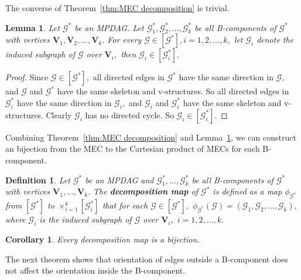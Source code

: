 \documentclass{article}
\newtheorem{definition}{Definition}
\newtheorem{lemma}{Lemma}
\newtheorem{corollary}{Corollary}
\begin{document}
The converse of Theorem~\ref{thm:MEC decomposition} is trivial.

\begin{lemma}
\label{lemma:inverse decomposition of MEC}
Let $\mathcal{G}^*$ be an MPDAG. Let $\mathcal{G}^*_1,\mathcal{G}^*_2,\dots,\mathcal{G}^*_k$ be all B-components of $\mathcal{G}^*$ with vertices $\mathbf{V}_1,\mathbf{V}_2,\dots,\mathbf{V}_k.$ For every $\mathcal{G}\in [\mathcal{G}^*], i=1,2,\dots,k,$ let $\mathcal{G}_i$ denote the induced subgraph of $\mathcal{G}$ over $\mathbf{V}_i,$ then $\mathcal{G}_i\in [\mathcal{G}^*_i].$ 
\end{lemma}
\begin{proof}
Since $\mathcal{G}\in [\mathcal{G}^*],$ all directed edges in $\mathcal{G}^*$ have the same direction in $\mathcal{G},$ and $\mathcal{G}$ and $\mathcal{G}^*$ have the same skeleton and v-structures. So all directed edges in $\mathcal{G}^*_i$ have the same direction in $\mathcal{G}_i,$ and $\mathcal{G}_i$ and $\mathcal{G}^*_i$ have the same skeleton and v-structures. Clearly $\mathcal{G}_i$ has no directed cycle. So $\mathcal{G}_i\in [\mathcal{G}^*_i].$
\end{proof}

Combining Theorem~\ref{thm:MEC decomposition} and Lemma~\ref{lemma:inverse decomposition of MEC}, we can construct an bijection from the MEC to the Cartesian product of MECs for each B-component.

\begin{definition}
Let $\mathcal{G}^*$ be an MPDAG and $\mathcal{G}^*_1,\dots,\mathcal{G}^*_k$ be all B-components of $\mathcal{G}^*$ with vertices $\mathbf{V}_1,\dots,\mathbf{V}_k.$ The \textbf{decomposition map} of $\mathcal{G}^*$ is defined as a map $\phi_{\mathcal{G}^*}$ from $[\mathcal{G}^*]$ to $\times_{i=1}^{k}[\mathcal{G}^*_i]$ that for each $\mathcal{G}\in [\mathcal{G}^*],$ $\phi_{\mathcal{G}^*}(\mathcal{G})=(\mathcal{G}_1,\mathcal{G}_2,\dots,\mathcal{G}_k),$ where $\mathcal{G}_i$ is the induced subgraph of $\mathcal{G}$ over $\mathbf{V}_i,$ $i=1,2,\dots,k.$
\end{definition}

\begin{corollary}
Every decomposition map is a bijection.
\end{corollary}

The next theorem shows that orientation of edges outside a B-component does not affect the orientation inside the B-component.
\end{document}
